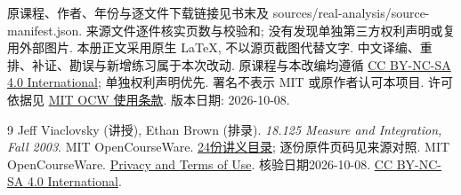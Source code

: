 原课程、作者、年份与逐文件下载链接见书末及 sources/real-analysis/source-manifest.json. 来源文件逐件核实页数与校验和; 没有发现单独第三方权利声明或复用外部图片. 本册正文采用原生 LaTeX, 不以源页截图代替文字. 中文译编、重排、补证、勘误与新增练习属于本次改动. 原课程与本改编均遵循 \href{https://creativecommons.org/licenses/by-nc-sa/4.0/}{CC BY-NC-SA 4.0 International}; 单独权利声明优先. 署名不表示 MIT 或原作者认可本项目. 许可依据见 \href{https://ocw.mit.edu/pages/privacy-and-terms-of-use/}{MIT OCW 使用条款}. 版本日期: 2026-10-08.
\clearpage

\clearpage
\markboth{}{}
\originalcontents
\clearpage
\mainmatter










\begin{thebibliography}{9}
 Jeff Viaclovsky (讲授), Ethan Brown (排录). \textit{18.125 Measure and Integration, Fall 2003}. MIT OpenCourseWare. \href{https://ocw.mit.edu/courses/18-125-measure-and-integration-fall-2003/pages/lecture-notes/}{24份讲义目录}; 逐份原件页码见来源对照.
 MIT OpenCourseWare. \href{https://ocw.mit.edu/pages/privacy-and-terms-of-use/}{Privacy and Terms of Use}. 核验日期2026-10-08. \href{https://creativecommons.org/licenses/by-nc-sa/4.0/}{CC BY-NC-SA 4.0 International}.
\end{thebibliography}

